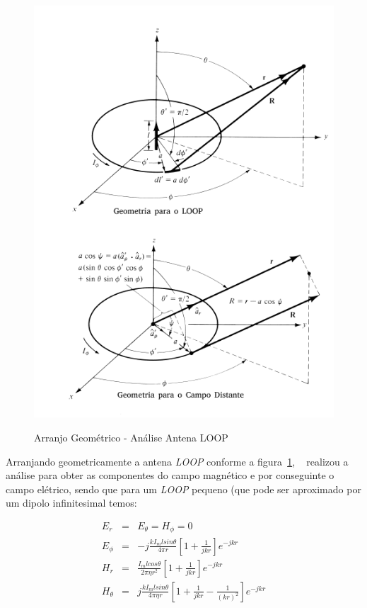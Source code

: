 \begin{figure}[htb!]
	\centering 
	\caption{Arranjo Geométrico - Análise Antena LOOP}
	\includegraphics[scale=0.9]{./img/balanis2005_geometria}
	\label{fig:balanis2005_geometria}
\end{figure}

Arranjando geometricamente a antena \textit{LOOP} conforme a figura~\ref{fig:balanis2005_geometria}, ~ realizou a análise para obter as componentes do campo magnético e por conseguinte o campo elétrico, sendo que para um \textit{LOOP} pequeno (que pode ser aproximado por um dipolo infinitesimal temos:

\begin{eqnarray}
E_r &=& E_\theta = H_\phi = 0\\
E_\phi &=& -j \frac{k I_m l sin\theta}{4 \pi r} \left [ 1 + \frac{1}{jkr} \right ] e^{-jkr}\\
H_r &=& \frac{I_m l cos\theta}{2\pi \eta r^2} \left [ 1 + \frac{1}{jkr} \right ] e^{-jkr}\\
H_\theta &=& j \frac{k I_m l sin \theta}{4\pi \eta r} \left [ 1 + \frac{1}{jkr} -\frac{1}{(kr)^2} \right ] e^{-jkr}
\end{eqnarray}

